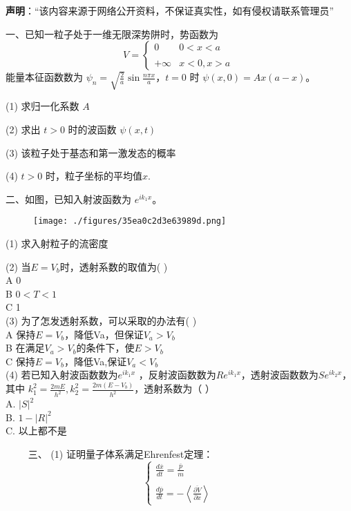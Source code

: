 
\textbf{声明}：“该内容来源于网络公开资料，不保证真实性，如有侵权请联系管理员”

一、已知一粒子处于一维无限深势阱时，势函数为
$$V = \begin{cases} 0 & 0 < x < a \\\\+\infty & x < 0, x > a \end{cases}~$$
能量本征函数数为 $\psi_n = \sqrt{\frac{2}{a}} \sin \frac{n\pi x}{a}$，$t = 0$ 时 $\psi(x, 0) = A x (a - x)$。

(1) 求归一化系数 $A$

(2) 求出 $t > 0$ 时的波函数 $\psi(x, t)$

(3) 该粒子处于基态和第一激发态的概率

(4) $t > 0$ 时，粒子坐标的平均值$x$.

二、如图，已知入射波函数为 $e^{ik_1x}$。
\begin{figure}[ht]
\centering
\texttt{[image: ./figures/35ea0c2d3e63989d.png]}
\caption{} \label{fig_UCSA17_2}
\end{figure}
(1) 求入射粒子的流密度

(2) 当$E = V_b$时，透射系数的取值为( )\\
A 0 \\
B $0 < T < 1$\\
C 1 \\

(3) 为了怎发透射系数，可以采取的办法有( )\\
A 保持$E = V_b$，降低Va，但保证$V_a > V_b$\\
B 在满足$V_a > V_b$的条件下，使$E > V_b$\\
C 保持$E = V_b$，降低Va,保证$V_a < V_b$\\

(4) 若已知入射波函数数为$ e^{ik_1x}$ ，反射波函数数为$R e^{ik_1x}$，透射波函数数为$S e^{ik_2x}$，其中 $k_1^2 = \frac{2mE}{h^2}, k_2^2 = \frac{2m(E - V_b)}{h^2} $，透射系数为（ ）\\
A. $|S|^2$ \\
B. $1 - |R|^2$ \\
C. 以上都不是

　　 三、
(1) 证明量子体系满足Ehrenfest定理：
$$\begin{cases}\frac{d \overline{x} }{dt} = \frac{\overline p }{m} \\\\
\frac{d\overline p }{dt} = -\left\langle \frac{\overline{\partial V}}{\partial x} \right\rangle\end{cases}~$$

